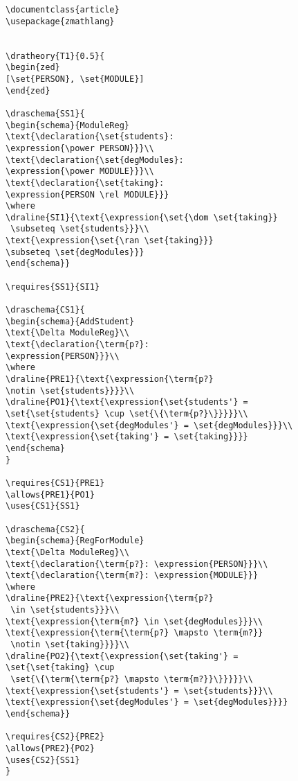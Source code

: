 \begin{verbatim}
\documentclass{article}
\usepackage{zmathlang}


\dratheory{T1}{0.5}{
\begin{zed}
[\set{PERSON}, \set{MODULE}]
\end{zed}

\draschema{SS1}{
\begin{schema}{ModuleReg}
\text{\declaration{\set{students}:
\expression{\power PERSON}}}\\
\text{\declaration{\set{degModules}:
\expression{\power MODULE}}}\\
\text{\declaration{\set{taking}:
\expression{PERSON \rel MODULE}}}
\where
\draline{SI1}{\text{\expression{\set{\dom \set{taking}}
 \subseteq \set{students}}}\\
\text{\expression{\set{\ran \set{taking}}} 
\subseteq \set{degModules}}}
\end{schema}}

\requires{SS1}{SI1}

\draschema{CS1}{
\begin{schema}{AddStudent}
\text{\Delta ModuleReg}\\
\text{\declaration{\term{p?}: 
\expression{PERSON}}}\\
\where
\draline{PRE1}{\text{\expression{\term{p?} 
\notin \set{students}}}}\\
\draline{PO1}{\text{\expression{\set{students'} = 
\set{\set{students} \cup \set{\{\term{p?}\}}}}}\\
\text{\expression{\set{degModules'} = \set{degModules}}}\\
\text{\expression{\set{taking'} = \set{taking}}}}
\end{schema}
}

\requires{CS1}{PRE1}
\allows{PRE1}{PO1}
\uses{CS1}{SS1}

\draschema{CS2}{
\begin{schema}{RegForModule}
\text{\Delta ModuleReg}\\
\text{\declaration{\term{p?}: \expression{PERSON}}}\\
\text{\declaration{\term{m?}: \expression{MODULE}}}
\where
\draline{PRE2}{\text{\expression{\term{p?}
 \in \set{students}}}\\
\text{\expression{\term{m?} \in \set{degModules}}}\\
\text{\expression{\term{\term{p?} \mapsto \term{m?}}
 \notin \set{taking}}}}\\
\draline{PO2}{\text{\expression{\set{taking'} = 
\set{\set{taking} \cup
 \set{\{\term{\term{p?} \mapsto \term{m?}}\}}}}}\\
\text{\expression{\set{students'} = \set{students}}}\\
\text{\expression{\set{degModules'} = \set{degModules}}}}
\end{schema}}

\requires{CS2}{PRE2}
\allows{PRE2}{PO2}
\uses{CS2}{SS1}
}

\end{verbatim}